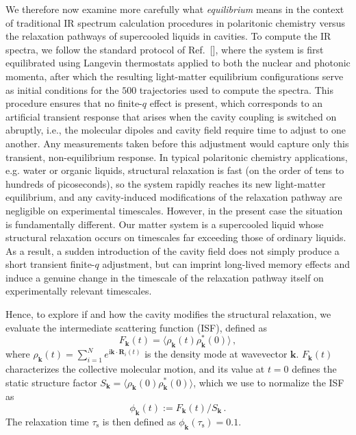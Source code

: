 \documentclass[aps, prl,
 reprint,
 superscriptaddress,
 citeautoscript,  %
 amsmath,amssymb,
 tightenlines
]{revtex4-2}
\begin{document}
We therefore now examine more carefully what \emph{equilibrium} means in the context of traditional IR spectrum calculation procedures in polaritonic chemistry versus the relaxation pathways of supercooled liquids in cavities. To compute the IR spectra, we follow the standard protocol of Ref.~[], where the system is first equilibrated using Langevin thermostats applied to both the nuclear and photonic momenta, after which the resulting light-matter equilibrium configurations serve as initial conditions for the $500$ trajectories used to compute the spectra. This procedure ensures that no finite-$q$ effect is present, which corresponds to an artificial transient response that arises when the cavity coupling is switched on abruptly, i.e., the molecular dipoles and cavity field require time to adjust to one another. Any measurements taken before this adjustment would capture only this transient, non-equilibrium response. In typical polaritonic chemistry applications, e.g. water or organic liquids, structural relaxation is fast (on the order of tens to hundreds of picoseconds), so the system rapidly reaches its new light-matter equilibrium, and any cavity-induced modifications of the relaxation pathway are negligible on experimental timescales. However, in the present case the situation is fundamentally different. Our matter system is a supercooled liquid whose structural relaxation occurs on timescales far exceeding those of ordinary liquids. As a result, a sudden introduction of the cavity field does not simply produce a short transient finite-$q$ adjustment, but can imprint long-lived memory effects and induce a genuine change in the timescale of the relaxation pathway itself on experimentally relevant timescales.

Hence, to explore if and how the cavity modifies the structural relaxation, we evaluate the intermediate scattering function (ISF), defined as  
\begin{equation}
F_{\bm{k}}(t) = \langle \rho_{\bm{k}}(t)\rho^*_{\bm k}(0) \rangle \,, \label{eq:ISF_equil}
\end{equation}
where $\rho_{\bm{k}}(t) = \sum_{i=1}^N e^{\mathrm{i} \bm{k} \cdot \bm{R}_i(t)}$ is the density mode at wavevector $\bm k$.  
$F_{\bm k}(t)$ characterizes the collective molecular motion, and its value at $t=0$ defines the static structure factor $S_{\bm k} = \langle \rho_{\bm{k}}(0)\rho^*_{\bm k}(0) \rangle$, which we use to normalize the ISF as  
\begin{equation}
\phi_{\bm k}(t) := F_{\bm{k}}(t)/S_{\bm k}\,.
\end{equation}
The relaxation time $\tau_\mathrm{s}$ is then defined as $\phi_{\bm k}(\tau_\mathrm{s}) = 0.1$. 
\end{document}
